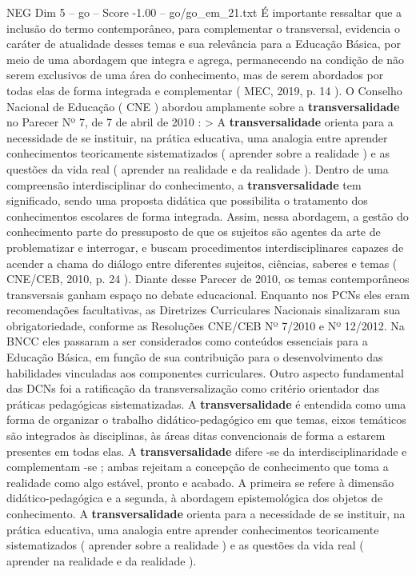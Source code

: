 \begin{textsample}{NEG Dim 5 – go – Score -1.00 – go/go\_em\_21.txt}
É importante ressaltar que a inclusão do termo contemporâneo, para complementar o transversal, evidencia o caráter de atualidade desses temas e sua relevância para a Educação Básica, por meio de uma abordagem que integra e agrega, permanecendo na condição de não serem exclusivos de uma área do conhecimento, mas de serem abordados por todas elas de forma integrada e complementar ( MEC, 2019, p. 14 ).
O Conselho Nacional de Educação ( CNE ) abordou amplamente sobre a \textbf{transversalidade} no Parecer Nº 7, de 7 de abril de 2010 : > A \textbf{transversalidade} orienta para a necessidade de se instituir, na prática educativa, uma analogia entre aprender conhecimentos teoricamente sistematizados ( aprender sobre a realidade ) e as questões da vida real ( aprender na realidade e da realidade ).
Dentro de uma compreensão interdisciplinar do conhecimento, a \textbf{transversalidade} tem significado, sendo uma proposta didática que possibilita o tratamento dos conhecimentos escolares de forma integrada.
Assim, nessa abordagem, a gestão do conhecimento parte do pressuposto de que os sujeitos são agentes da arte de problematizar e interrogar, e buscam procedimentos interdisciplinares capazes de acender a chama do diálogo entre diferentes sujeitos, ciências, saberes e temas ( CNE/CEB, 2010, p. 24 ).
Diante desse Parecer de 2010, os temas contemporâneos transversais ganham espaço no debate educacional.
Enquanto nos PCNs eles eram recomendações facultativas, as Diretrizes Curriculares Nacionais sinalizaram sua obrigatoriedade, conforme as Resoluções CNE/CEB Nº 7/2010 e Nº 12/2012.
Na BNCC eles passaram a ser considerados como conteúdos essenciais para a Educação Básica, em função de sua contribuição para o desenvolvimento das habilidades vinculadas aos componentes curriculares.
Outro aspecto fundamental das DCNs foi a ratificação da transversalização como critério orientador das práticas pedagógicas sistematizadas.
A \textbf{transversalidade} é entendida como uma forma de organizar o trabalho didático-pedagógico em que temas, eixos temáticos são integrados às disciplinas, às áreas ditas convencionais de forma a estarem presentes em todas elas.
A \textbf{transversalidade} difere -se da interdisciplinaridade e complementam -se ; ambas rejeitam a concepção de conhecimento que toma a realidade como algo estável, pronto e acabado.
A primeira se refere à dimensão didático-pedagógica e a segunda, à abordagem epistemológica dos objetos de conhecimento.
A \textbf{transversalidade} orienta para a necessidade de se instituir, na prática educativa, uma analogia entre aprender conhecimentos teoricamente sistematizados ( aprender sobre a realidade ) e as questões da vida real ( aprender na realidade e da realidade ).

\end{textsample}
